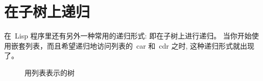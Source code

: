 \section{在子树上递归}
\label{sec:function:recursion_on_subtrees}

在~Lisp 程序里还有另外一种常用的递归形式: 即在子树上进行递归。
当你开始使用嵌套列表，而且希望递归地访问列表的~car 和~cdr 之时,
这种递归形式就出现了。
\begin{figure}
\centering
  \hspace{0.1\textwidth}
  \hspace{0.1\textwidth}
  \caption{用列表表示的树}
  \label{fig:lists_as_trees}
\end{figure}


